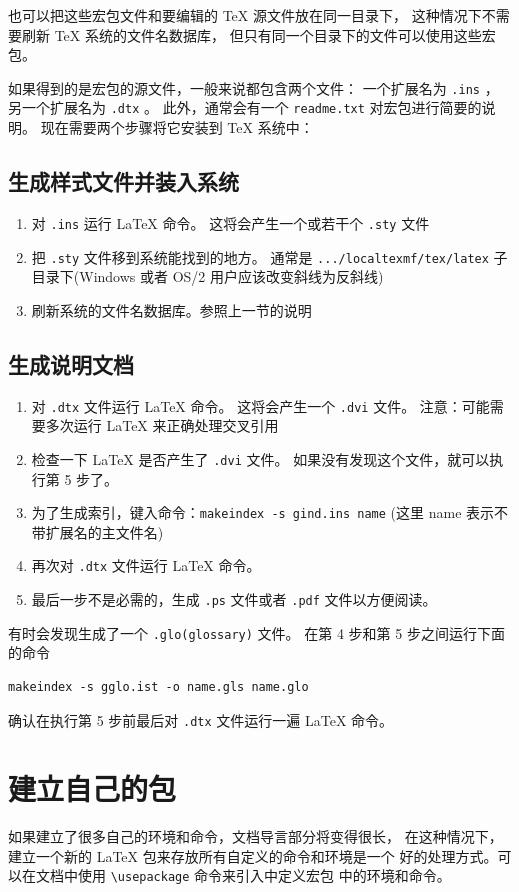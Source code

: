 \documentclass[a4paper,11pt]{article}
\begin{document}
也可以把这些宏包文件和要编辑的 \TeX{} 源文件放在同一目录下，
这种情况下不需要刷新 \TeX{} 系统的文件名数据库，
但只有同一个目录下的文件可以使用这些宏包。

如果得到的是宏包的源文件，一般来说都包含两个文件：
一个扩展名为 \verb+.ins+ ，另一个扩展名为 \verb+.dtx+ 。
此外，通常会有一个 \verb+readme.txt+ 对宏包进行简要的说明。
现在需要两个步骤将它安装到 \TeX{} 系统中：
\subsection{生成样式文件并装入系统}
\begin{enumerate}
	\item 对 \verb+.ins+ 运行 \LaTeX{} 命令。
		这将会产生一个或若干个 \verb+.sty+ 文件
	\item 把 \verb+.sty+ 文件移到系统能找到的地方。
		通常是 \verb+.../localtexmf/tex/latex+
		子目录下(Windows 或者 OS/2 用户应该改变斜线为反斜线)
	\item 刷新系统的文件名数据库。参照上一节的说明
\end{enumerate}

\subsection{生成说明文档}
\begin{enumerate}
	\item 对 \verb+.dtx+ 文件运行 \LaTeX{} 命令。
		这将会产生一个 \verb+.dvi+ 文件。
		注意：可能需要多次运行 \LaTeX{} 来正确处理交叉引用
	\item 检查一下 \LaTeX{} 是否产生了 \verb+.dvi+ 文件。
		如果没有发现这个文件，就可以执行第 5 步了。
	\item 为了生成索引，键入命令：\verb+makeindex -s gind.ins name+
		(这里 name 表示不带扩展名的主文件名)
	\item 再次对  \verb+.dtx+ 文件运行 \LaTeX{} 命令。
	\item 最后一步不是必需的，生成 \verb+.ps+ 文件或者 \verb+.pdf+
		文件以方便阅读。
\end{enumerate}
有时会发现生成了一个 \verb+.glo(glossary)+ 文件。
在第 4 步和第 5 步之间运行下面的命令
\begin{Verbatim}
makeindex -s gglo.ist -o name.gls name.glo
\end{Verbatim}
确认在执行第 5 步前最后对 \verb+.dtx+ 文件运行一遍 \LaTeX{} 命令。

\section{建立自己的包}
如果建立了很多自己的环境和命令，文档导言部分将变得很长，
在这种情况下，建立一个新的 \LaTeX{} 包来存放所有自定义的命令和环境是一个%
好的处理方式。可以在文档中使用 \verb+\usepackage+ 命令来引入中定义宏包%
中的环境和命令。
\end{document}
